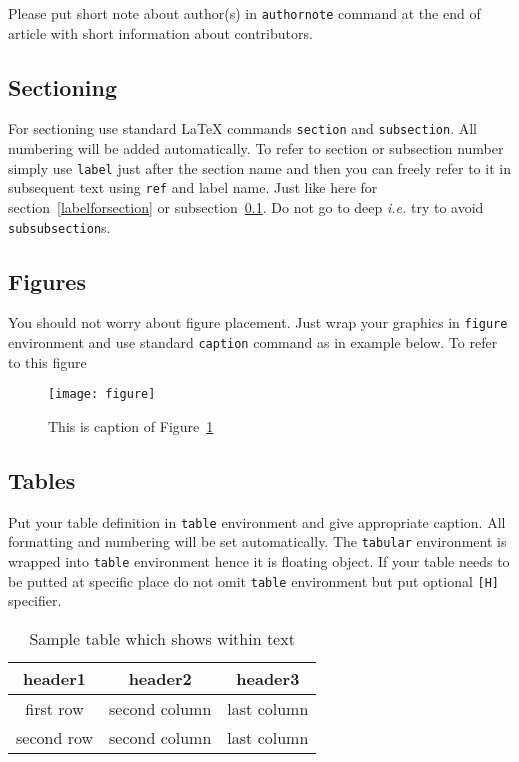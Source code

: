 \documentclass{rgg}
\begin{document}
    Please put short note about author(s)
    in \texttt{authornote} command 
    at the end of article with short information about
    contributors.


  \subsection{Sectioning}
    \label{labelforsubsection}
    For sectioning use standard \LaTeX{} commands
    \texttt{section} and \texttt{subsection}.
    All numbering will be added automatically.
    To refer to section or subsection number
    simply use \texttt{label} just after the section
    name and then you can freely refer to it in subsequent text
    using \texttt{ref} and label name.
    Just like here for section~\ref{labelforsection} or
    subsection~\ref{labelforsubsection}.
    Do not go to deep \emph{i.e.} try to avoid
    \texttt{subsubsection}s. 


  \subsection{Figures}
    You should not worry about figure placement.
    Just wrap your graphics in \texttt{figure}
    environment and use standard \texttt{caption}
    command as in example below.
    To refer to this figure
    \begin{figure}
      \texttt{[image: figure]}
      \caption{This is caption of Figure~\ref{figurecaption}}
      \label{figurecaption}
    \end{figure}

  \subsection{Tables}
    Put your table definition in 
    \texttt{table} environment and give appropriate caption.
    All formatting and numbering will be set automatically.
    The \texttt{tabular} environment is wrapped into 
    \texttt{table} environment hence it is floating object.
    If your table needs to be putted at specific place
    do not omit \texttt{table} environment but put
    optional \texttt{[H]} specifier.

    \begin{table}[H]
      \caption{Sample table which shows within text}
      \label{labelforheretable}
      \begin{tabular}{ccc}
        \toprule
        header1 & header2 & header3 \\
        \midrule
        first row  & second column & last column \\
        second row & second column & last column \\
        \bottomrule
      \end{tabular}
    \end{table}
\end{document}
